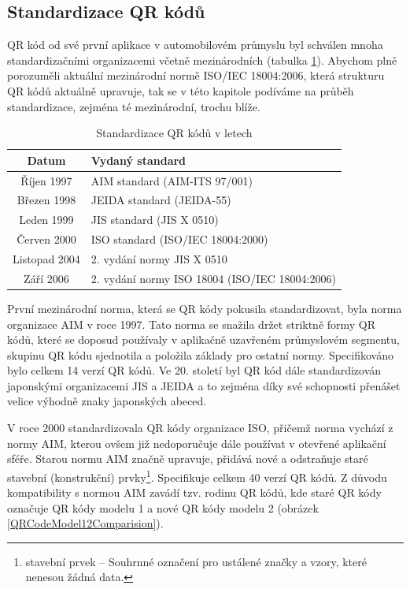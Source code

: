\subsection{Standardizace QR kódů}
\label{standardizaceQRKodu}

QR kód od své první aplikace v automobilovém průmyslu byl schválen mnoha
standardizačními organizacemi včetně mezinárodních (tabulka 
\ref{standardizaceBehemLet}). Abychom plně porozuměli aktuální mezinárodní normě
ISO/IEC 18004:2006, která strukturu QR kódů aktuálně upravuje, tak se v této 
kapitole podíváme na průběh standardizace, zejména té mezinárodní, trochu blíže.

\begin{table}[H]
  \begin{center} 
    \begin{tabular}{| c | l |} \hline
    \textbf{Datum} & \textbf{Vydaný standard} \\ \hline
    Říjen 1997 & AIM standard (AIM-ITS 97/001) \\ \hline
    Březen 1998 & JEIDA standard (JEIDA-55) \\ \hline
    Leden 1999 & JIS standard (JIS X 0510)  \\ \hline
    Červen 2000 & ISO standard (ISO/IEC 18004:2000) \\ \hline
    Listopad 2004 & 2. vydání normy JIS X 0510 \\ \hline
    Září 2006 & 2. vydání normy ISO 18004 (ISO/IEC 18004:2006)  \\ \hline
    \end{tabular}
    \caption{Standardizace QR kódů v letech \cite{standardizaceDenso}}
    \label{standardizaceBehemLet}
  \end{center}
\end{table}

První mezinárodní norma, která se QR kódy pokusila standardizovat, byla norma 
organizace AIM v roce 1997. Tato norma se snažila držet striktně formy QR kódů, 
které se doposud používaly v aplikačně uzavřeném průmyslovém segmentu, skupinu 
QR kódu sjednotila a položila základy pro ostatní normy. Specifikováno bylo 
celkem 14 verzí QR kódů. Ve 20. století byl QR kód dále standardizován 
japonskými organizacemi JIS a JEIDA a to zejména díky své schopnosti přenášet 
velice výhodně znaky japonských abeced.

V roce 2000 standardizovala QR kódy organizace ISO, přičemž norma vychází 
z normy AIM, kterou ovšem již nedoporučuje dále používat v otevřené 
aplikační sféře. Starou normu AIM značně upravuje, přidává nové a 
odstraňuje staré stavební (konstrukční) prvky\footnote{stavební prvek -- Souhrnné označení pro
ustálené značky a vzory, které nenesou žádná data.}.
Specifikuje celkem 40 verzí QR kódů. Z důvodu kompatibility s normou AIM 
zavádí tzv. rodinu QR kódů, kde staré QR kódy označuje QR kódy modelu 1 a nové
QR kódy modelu 2 (obrázek \ref{QRCodeModel12Comparision}).


